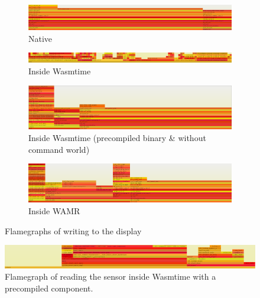 \begin{figure}
  \begin{subfigure}{\linewidth}
    \centering
    \includegraphics[width=\textwidth]{figures/native_led_flamegraph}
    \caption{Native}
    \label{fig:flamegraph:led:native}
  \end{subfigure}
  \begin{subfigure}{\linewidth}
    \centering
    \includegraphics[width=\textwidth]{figures/wasmtime_flamegraph}
    \caption{Inside Wasmtime}
    \label{fig:flamegraph:wasmtime}
  \end{subfigure}
  \begin{subfigure}{\linewidth}
    \centering
    \includegraphics[width=\textwidth]{figures/optim_led_flamegraph}
    \caption{Inside Wasmtime (precompiled binary \& without command world)}
    \label{fig:flamegraph:led:compiled}
  \end{subfigure}
  \begin{subfigure}{\linewidth}
    \centering
    \includegraphics[width=\textwidth]{figures/wamr_led_flamegraph}
    \caption{Inside WAMR}
    \label{fig:flamegraph:led:wamr}
  \end{subfigure}
  \caption{Flamegraphs of writing to the display}
\end{figure}

\begin{figure}
  \centering
  \includegraphics[width=\textwidth,keepaspectratio]{figures/compiled_sensor_flamegraph}
  \caption{Flamegraph of reading the sensor inside Wasmtime with a precompiled component.}
  \label{fig:flamegraph:sensor}
\end{figure}


